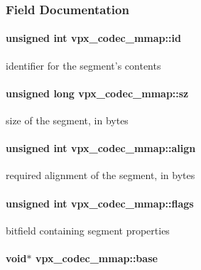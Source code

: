 \subsubsection{\-Field \-Documentation}
\hypertarget{structvpx__codec__mmap_a83f482a223678a60c22362f44e36e8c8}{
\paragraph[{id}]{\setlength{\rightskip}{0pt plus 5cm}unsigned int {\bf vpx\-\_\-codec\-\_\-mmap\-::id}}}\label{structvpx__codec__mmap_a83f482a223678a60c22362f44e36e8c8}
identifier for the segment's contents \hypertarget{structvpx__codec__mmap_ae6822e6985cef61d2341a8d429bea079}{
\paragraph[{sz}]{\setlength{\rightskip}{0pt plus 5cm}unsigned long {\bf vpx\-\_\-codec\-\_\-mmap\-::sz}}}\label{structvpx__codec__mmap_ae6822e6985cef61d2341a8d429bea079}
size of the segment, in bytes \hypertarget{structvpx__codec__mmap_a7875d3878f1d58c205f396c1f696987b}{
\paragraph[{align}]{\setlength{\rightskip}{0pt plus 5cm}unsigned int {\bf vpx\-\_\-codec\-\_\-mmap\-::align}}}\label{structvpx__codec__mmap_a7875d3878f1d58c205f396c1f696987b}
required alignment of the segment, in bytes \hypertarget{structvpx__codec__mmap_afd7f8fed412b7bb524bed8e6ed14400d}{
\paragraph[{flags}]{\setlength{\rightskip}{0pt plus 5cm}unsigned int {\bf vpx\-\_\-codec\-\_\-mmap\-::flags}}}\label{structvpx__codec__mmap_afd7f8fed412b7bb524bed8e6ed14400d}
bitfield containing segment properties \hypertarget{structvpx__codec__mmap_a0f7580ef4f5680df53c1ef3bd5f66d01}{
\paragraph[{base}]{\setlength{\rightskip}{0pt plus 5cm}void$\ast$ {\bf vpx\-\_\-codec\-\_\-mmap\-::base}}}\label{structvpx__codec__mmap_a0f7580ef4f5680df53c1ef3bd5f66d01}

